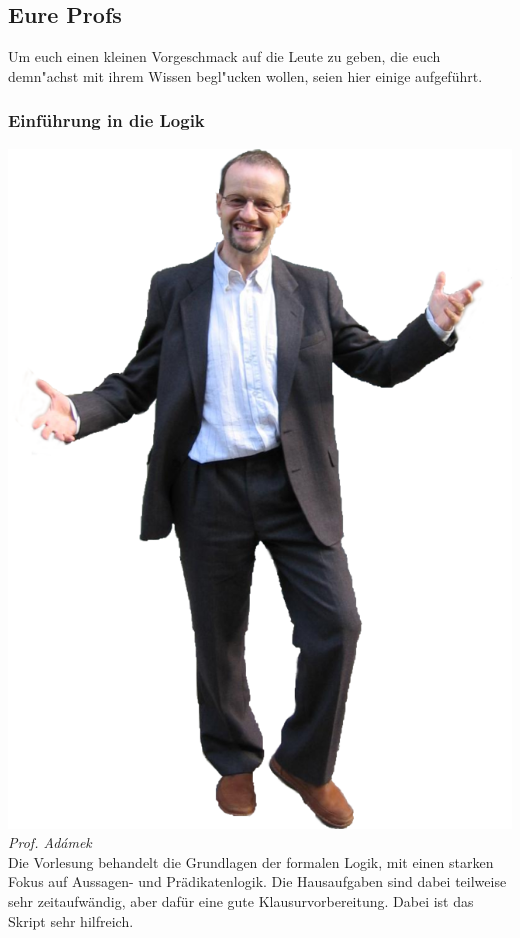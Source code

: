 \subsection{Eure Profs}
Um euch einen kleinen Vorgeschmack auf die Leute zu geben, die euch
demn"achst mit ihrem Wissen begl"ucken wollen, seien hier einige
aufgeführt. 


\subsubsection{Einführung in die Logik}%
\includegraphics[width=0.8\linewidth]{bilder/dozenten/adamek.png}\\
\textit{Prof.  Adámek}\\
Die Vorlesung behandelt die Grundlagen der formalen Logik, mit einen
starken Fokus auf Aussagen- und Prädikatenlogik. Die Hausaufgaben sind
dabei teilweise sehr zeitaufwändig, aber dafür eine gute
Klausurvorbereitung. Dabei ist das Skript sehr hilfreich.
\\
